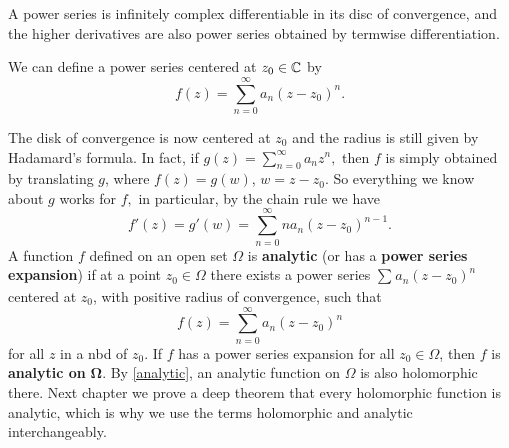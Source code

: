\begin{cor}
    A power series is infinitely complex differentiable in its disc of convergence, and the higher derivatives are also power series obtained by termwise differentiation.
\end{cor}
\begin{definition}
    We can define a power series centered at $z_0\in \mathbb{C}$ by \[
        f(z)=\sum_{n=0}^{\infty} a_n (z-z_0)^n .
    \]  
\end{definition}
The disk of convergence is now centered at $z_0$ and the radius is still given by Hadamard's formula. In fact, if $
    g(z)=\sum_{n=0}^{\infty} a_n z^n,
$ then $f$ is simply obtained by translating $g$, where $f(z)=g(w)$, $w=z-z_0$. So everything we know about $g$ works for $f,$ in particular, by the chain rule we have \[
f'(z)=g'(w)=\sum_{n=0}^{\infty} na_n (z-z_0)^{n-1}.
\] 
A function $f$ defined on an open set $\Omega$ is \textbf{analytic} (or has a \textbf{power series expansion}) if at a point $z_0\in \Omega$ there exists a power series $\sum_{}^{} a_n (z-z_0)^n $ centered at $z_0$, with positive radius of convergence, such that \[
    f(z)=\sum_{n=0}^{\infty} a_n (z-z_0)^n 
\] for all $z$ in a nbd of $z_0$. If $f$ has a power series expansion for all $z_0\in \Omega$, then $f$ is \textbf{analytic on} $\mathbf{\Omega}$. By \cref{analytic}, an analytic function on $\Omega$ is also holomorphic there. Next chapter we prove a deep theorem that every holomorphic function is analytic, which is why we use the terms holomorphic and analytic interchangeably.


